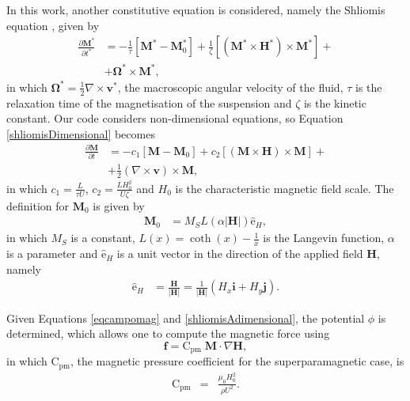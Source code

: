 \documentclass[journal]{IEEEtran}
\begin{document}
In this work, another constitutive equation is considered, namely the Shliomis equation \cite{shliomis1972}, given by \begin{align}
\frac{\partial \mathbf{M}^*}{\partial t^*} &= -\frac{1}{\tau}[\mathbf{M}^* - \mathbf{M}_0^*]+\frac{1}{\zeta}[(\mathbf{M}^*\times \mathbf{H}^*)\times\mathbf{M}^*]+\nonumber\\ &+\mathbf{\Omega^*}\times \mathbf{M}^*\label{shliomisDimensional},
\end{align} in which $\mathbf{\Omega}^*=\frac{1}{2}\nabla\times \mathbf{v}^*$, the macroscopic angular velocity of the fluid, $\tau$ is the relaxation time of the magnetisation of the suspension and $\zeta$ is the kinetic constant. Our code considers non-dimensional equations, so Equation \ref{shliomisDimensional} becomes \begin{align}
	\frac{\partial \mathbf{M}}{\partial t} &= -c_1[\mathbf{M} - \mathbf{M}_0]+c_2[(\mathbf{M}\times \mathbf{H})\times\mathbf{M}]+\nonumber\\ &+\frac{1}{2}(\nabla\times \mathbf{v})\times \mathbf{M},\label{shliomisAdimensional}
\end{align} in which $c_1 = \frac{L}{\tau U}$, $c_2 = \frac{L H_0^2}{U\zeta}$ and $H_0$ is the characteristic magnetic field scale. The definition for $\mathbf{M}_0$ \cite{RosensweigMagneticFluids} is given by \begin{align}
	\mathbf{M}_0 & = M_S L(\alpha|\mathbf{H}|)\hat{\mathrm{e}}_H,
\end{align} in which $M_S$ is a constant, $L(x) = \coth(x) - \frac{1}{x}$ is the Langevin function, $\alpha$ is a parameter and $\hat{\mathrm{e}}_H$ is a unit vector in the direction of the applied field $\mathbf{H}$, namely \begin{align}
	\hat{\mathrm{e}}_H & = \frac{\mathbf{H}}{|\mathbf{H}|} =  \frac{1}{|\mathbf{H}|}\left(H_x\mathbf{i} + H_y\mathbf{j}\right).
\end{align}

Given Equations \ref{eqcampomag} and \ref{shliomisAdimensional},  the potential $\phi$ is determined, which allows one to compute the magnetic force using \begin{equation}
	\mathbf{f} = \mathrm{C}_{\mathrm{pm}}\; \mathbf{M}\cdot \nabla \mathbf{H},\label{magneticforce}\end{equation} in which $\mathrm{C}_{\mathrm{pm}}$, the magnetic pressure coefficient for the superparamagnetic case, is \begin{eqnarray}
\mathrm{C}_{\mathrm{pm}} & = & \frac{\mu_0 H_0^2}{\rho U ^2}.\label{cpm}
\end{eqnarray}
\end{document}
